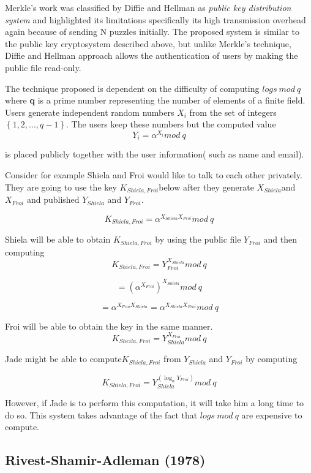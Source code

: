 \documentclass{article}
\begin{document}
Merkle's\cite{merkle_secure_1978} work was classified by Diffie and
Hellman as \textit{public key distribution system} and highlighted
its limitations specifically its high transmission overhead again
because of sending N puzzles initially. The proposed system is similar
to the public key cryptosystem described above, but unlike Merkle's
technique, Diffie and Hellman approach allows the authentication of
users by making the public file read-only\cite{diffie_new_1976}. 

The technique proposed is dependent on the difficulty of computing
$logs\: mod\: q$ where \textbf{q} is a prime number representing
the number of elements of a finite field. Users generate independent
random numbers $X_{i}$ from the set of integers $\left\{ 1,2,...,q-1\right\} $.
The users keep these numbers but the computed value 
\[
Y_{i}=\alpha^{X_{i}}mod\: q
\]


is placed publicly together with the user information( such as name
and email). 

Consider for example Shiela and Froi would like to talk to each other
privately. They are going to use the key $K_{Shiela,Froi}$below after
they generate $X_{Shiela}$and $X_{Froi}$ and published $Y_{Shiela}$
and $Y_{Froi}$.

\[
K_{Shiela,Froi}=\alpha^{X_{Shiela}X_{Froi}}mod\: q
\]


Shiela will be able to obtain $K_{Shiela,Froi}$ by using the public
file $Y_{Froi}$ and then computing
\[
K_{Shiela,Froi}=Y_{Froi}^{X_{Shiela}}mod\: q
\]
 
\[
=(\alpha^{X_{Froi}})^{X_{Shiela}}mod\: q
\]


\[
=\alpha^{X_{Froi}X_{Shiela}}=\alpha^{X_{Shiela}X_{Froi}}mod\: q
\]


Froi will be able to obtain the key in the same manner. 
\[
K_{Sheila,Froi}=Y_{Shiela}^{X_{Froi}}mod\: q
\]
 

Jade might be able to compute$K_{Shiela,Froi}$ from $Y_{Shiela}$
and $Y_{Froi}$ by computing

\[
K_{Shiela,Froi}=Y_{Shiela}^{(\log_{\alpha}Y_{Froi})}mod\: q
\]


However, if Jade is to perform this computation, it will take him
a long time to do so. This system takes advantage of the fact that
$logs\: mod\: q$ are expensive to compute.


\subsection{Rivest-Shamir-Adleman (1978)}
\end{document}
